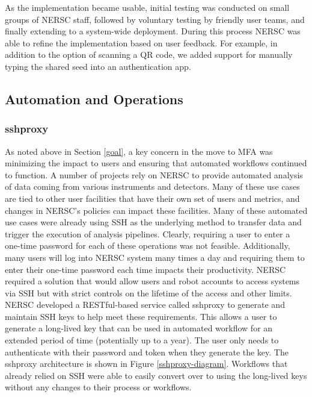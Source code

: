 \documentclass[sigconf,review]{acmart}
\begin{document}
As the implementation became usable, initial testing was conducted on small
groups of NERSC staff, followed by voluntary testing by friendly user teams, and
finally extending to a system-wide deployment. During this process NERSC was
able to refine the implementation based on user feedback. For example, in
addition to the option of scanning a QR code, we added support for manually
typing the shared seed into an authentication app.

\subsection{Automation and Operations}
\label{auto}

\subsubsection{sshproxy}
\label{proxy}

As noted above in Section \ref{goal}, a key concern in the move to MFA was
minimizing the impact to users and ensuring that automated workflows continued
to function. A number of projects rely on NERSC to provide automated analysis of
data coming from various instruments and detectors.  Many of these use cases are
tied to other user facilities that have their own set of users and metrics, and
changes in NERSC's policies can impact these facilities.  Many of these
automated use cases were already using SSH as the underlying method to transfer
data and trigger the execution of analysis pipelines.  Clearly, requiring a user
to enter a one-time password for each of these operations was not feasible.
Additionally, many users will log into NERSC system many times a day and
requiring them to enter their one-time password each time impacts their
productivity.  NERSC required a solution that would allow users and robot
accounts to access systems via SSH but with strict controls on the lifetime of
the access and other limits.  NERSC developed a RESTful-based service called
sshproxy to generate and maintain SSH keys to help meet these requirements. 
This allows a user to generate a long-lived key that can be used in automated workflow 
for an extended period of time (potentially up to a year).  The user only needs to authenticate
with their password and token when they generate the key.  The
sshproxy architecture is shown in Figure \ref{sshproxy-diagram}.
Workflows that already relied on SSH were able to easily convert over to using
the long-lived keys without any changes to their process or workflows.
\end{document}
